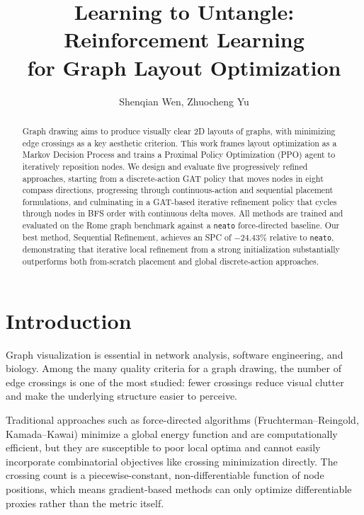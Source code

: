 \documentclass[10pt,twocolumn]{article}
\title{\textbf{Learning to Untangle: Reinforcement Learning\\for Graph Layout Optimization}}
\author{Shenqian Wen, Zhuocheng Yu}
\date{}
\begin{document}
\maketitle

\begin{abstract}
Graph drawing aims to produce visually clear 2D layouts of graphs, with
minimizing edge crossings as a key aesthetic criterion.  This work frames
layout optimization as a Markov Decision Process and trains a Proximal Policy
Optimization (PPO) agent to iteratively reposition nodes.  We design and
evaluate five progressively refined approaches, starting from a discrete-action
GAT policy that moves nodes in eight compass directions, progressing through
continuous-action and sequential placement formulations, and culminating in a
GAT-based iterative refinement policy that cycles through nodes in BFS order
with continuous delta moves.  All methods are trained and evaluated on the
Rome graph benchmark against a \texttt{neato} force-directed baseline.
Our best method, Sequential Refinement, achieves an SPC of $-24.43\%$
relative to \texttt{neato}, demonstrating that iterative local refinement
from a strong initialization substantially outperforms both from-scratch
placement and global discrete-action approaches.
\end{abstract}

\section{Introduction}
\label{sec:intro}

Graph visualization is essential in network analysis, software engineering,
and biology.  Among the many quality criteria for a graph drawing, the number
of edge crossings is one of the most studied: fewer crossings reduce visual
clutter and make the underlying structure easier to perceive.

Traditional approaches such as force-directed algorithms (Fruchterman--Reingold,
Kamada--Kawai) minimize a global energy function and are computationally
efficient, but they are susceptible to poor local optima and cannot easily
incorporate combinatorial objectives like crossing minimization directly.
The crossing count is a piecewise-constant, non-differentiable function of
node positions, which means gradient-based methods can only optimize
differentiable proxies rather than the metric itself.
\end{document}

